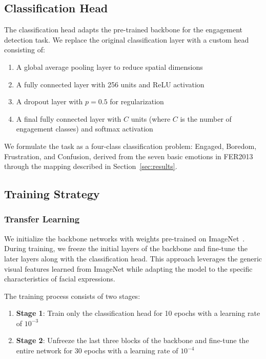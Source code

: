 \documentclass[apajournal,article,submit,pdftex,moreauthors]{Definitions/mdpi}
\begin{document}
\subsection{Classification Head}

The classification head adapts the pre-trained backbone for the engagement detection task. We replace the original classification layer with a custom head consisting of:
\begin{enumerate}
\item A global average pooling layer to reduce spatial dimensions
\item A fully connected layer with 256 units and ReLU activation
\item A dropout layer with $p = 0.5$ for regularization~\citep{bengio2013representation}
\item A final fully connected layer with $C$ units (where $C$ is the number of engagement classes) and softmax activation
\end{enumerate}

We formulate the task as a four-class classification problem: Engaged, Boredom, Frustration, and Confusion, derived from the seven basic emotions in FER2013 through the mapping described in Section~\ref{sec:results}.

\subsection{Training Strategy}

\subsubsection{Transfer Learning}

We initialize the backbone networks with weights pre-trained on ImageNet~\cite{deng2009imagenet,russakovsky2015imagenet}. During training, we freeze the initial layers of the backbone and fine-tune the later layers along with the classification head. This approach leverages the generic visual features learned from ImageNet while adapting the model to the specific characteristics of facial expressions.

The training process consists of two stages:
\begin{enumerate}
\item \textbf{Stage 1}: Train only the classification head for 10 epochs with a learning rate of $10^{-3}$
\item \textbf{Stage 2}: Unfreeze the last three blocks of the backbone and fine-tune the entire network for 30 epochs with a learning rate of $10^{-4}$
\end{enumerate}
\end{document}
